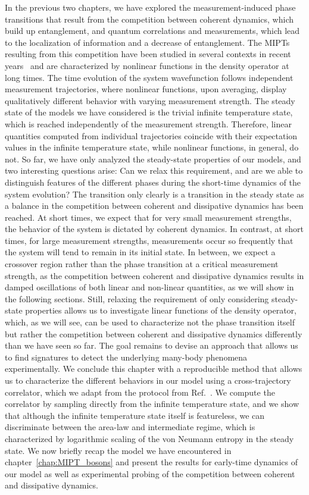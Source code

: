 In the previous two chapters, we have explored the measurement-induced phase transitions that result from the competition between coherent dynamics, which build up entanglement, and quantum correlations and measurements, which lead to the localization of information and a decrease of entanglement. The MIPTs resulting from this competition have been studied in several contexts in recent years~\cite{li2018,li2019,skinner2019} and are characterized by nonlinear functions in the density operator at long times. The time evolution of the system wavefunction follows independent measurement trajectories, where nonlinear functions, upon averaging, display qualitatively different behavior with varying measurement strength. The steady state of the models we have considered is the trivial infinite temperature state, which is reached independently of the measurement strength. Therefore, linear quantities computed from individual trajectories coincide with their expectation values in the infinite temperature state, while nonlinear functions, in general, do not. So far, we have only analyzed the steady-state properties of our models, and two interesting questions arise: Can we relax this requirement, and are we able to distinguish features of the different phases during the short-time dynamics of the system evolution? The transition only clearly is a transition in the steady state as a balance in the competition between coherent and dissipative dynamics has been reached. At short times, we expect that for very small measurement strengths, the behavior of the system is dictated by coherent dynamics. In contrast, at short times, for large measurement strengths, measurements occur so frequently that the system will tend to remain in its initial state. In between, we expect a crossover region rather than the phase transition at a critical measurement strength, as the competition between coherent and dissipative dynamics results in damped oscillations of both linear and non-linear quantities, as we will show in the following sections. Still, relaxing the requirement of only considering steady-state properties allows us to investigate linear functions of the density operator, which, as we will see, can be used to characterize not the phase transition itself but rather the competition between coherent and dissipative dynamics differently than we have seen so far. The goal remains to devise an approach that allows us to find signatures to detect the underlying many-body phenomena experimentally. We conclude this chapter with a reproducible method that allows us to characterize the different behaviors in our model using a cross-trajectory correlator, which we adapt from the protocol from Ref.~\cite{vermersch2019}. We compute the correlator by sampling directly from the infinite temperature state, and we show that although the infinite temperature state itself is featureless, we can discriminate between the area-law and intermediate regime, which is characterized by logarithmic scaling of the von Neumann entropy in the steady state. We now briefly recap the model we have encountered in chapter~\ref{chap:MIPT_bosons} and present the results for early-time dynamics of our model as well as experimental probing of the competition between coherent and dissipative dynamics.

